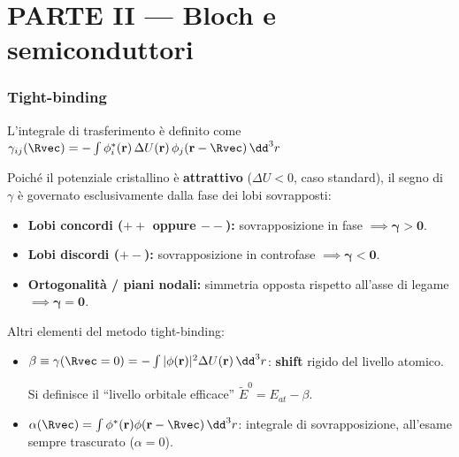 \part*{\centering PARTE II --- Bloch e semiconduttori}
\vspace{-0.3cm}

\section{Tight-binding}

L'integrale di trasferimento è definito come $\gamma_{ij}(\Rvec) = -\int \phi_i^*(\mathbf{r})\,\Delta U(\mathbf{r})\,\phi_j(\mathbf{r}-\Rvec)\,\dd^3 r$

Poiché il potenziale cristallino è \textbf{attrattivo} ($\Delta U < 0$, caso standard), il segno di $\gamma$ è governato esclusivamente dalla fase dei lobi sovrapposti:
\begin{itemize}
    \setlength{\itemsep}{1pt}
    \item \textbf{Lobi concordi ($++$ oppure $--$):} sovrapposizione in fase $\implies \bm{\gamma > 0}$.
    \item \textbf{Lobi discordi ($+-$):} sovrapposizione in controfase $\implies \bm{\gamma < 0}$.
    \item \textbf{Ortogonalità / piani nodali:} simmetria opposta rispetto all'asse di legame $\implies \bm{\gamma = 0}$.
\end{itemize}


\vspace{0.15cm}
\noindent Altri elementi del metodo tight-binding:
\begin{itemize}
  \item $\beta \equiv \gamma(\Rvec=0) = -\int|\phi(\mathbf{r})|^2\Delta U(\mathbf{r})\,\dd^3r$: \textbf{shift} rigido del livello atomico. 
  
  Si definisce il ``livello orbitale efficace'' $\tilde E^0 = E_{at} - \beta$.
  \item $\alpha(\Rvec)=\int\phi^*(\mathbf{r})\phi(\mathbf{r}-\Rvec)\,\dd^3r$: integrale di sovrapposizione, all'esame sempre trascurato ($\alpha=0$).
\end{itemize}

